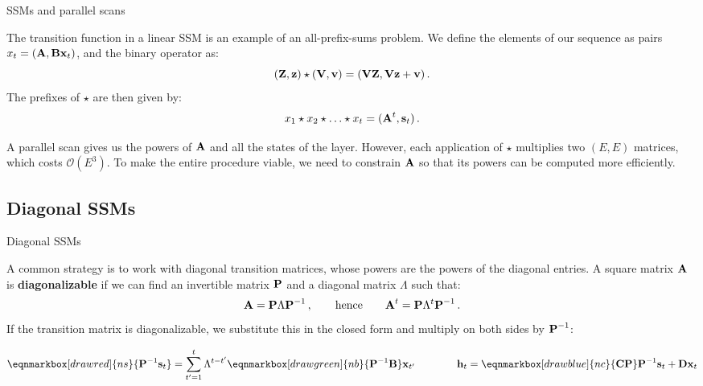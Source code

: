 \documentclass[11pt,aspectratio=169]{beamer}
\begin{document}
\begin{frame}{SSMs and parallel scans}
    \setlength{\parskip}{6pt}

    The transition function in a linear SSM is an example of an all-prefix-sums
    problem. We define the elements of our sequence as pairs
    $x_t=(\boldsymbol{\mathbf{A}},\boldsymbol{\mathbf{B}}\boldsymbol{\mathbf{x}}_t)$, and the binary operator as:
    \[
        (\boldsymbol{\mathbf{Z}},\boldsymbol{\mathbf{z}})\star(\boldsymbol{\mathbf{V}},\boldsymbol{\mathbf{v}})=(\boldsymbol{\mathbf{V}}\boldsymbol{\mathbf{Z}},\boldsymbol{\mathbf{V}}\boldsymbol{\mathbf{z}}+\boldsymbol{\mathbf{v}}) \,.
    \]
    The prefixes of $\star$ are then given by:
    \[
        x_1\star x_2\star\ldots\star x_t=(\boldsymbol{\mathbf{A}}^t,\boldsymbol{\mathbf{s}}_t) \,.
    \]

    A parallel scan gives us the powers of $\boldsymbol{\mathbf{A}}$ and all the states of the
    layer. However, each application of $\star$
    multiplies two $(E,E)$ matrices, which costs $\mathcal{O}(E^3)$. To make
    the entire procedure viable, we need to constrain $\boldsymbol{\mathbf{A}}$ so that its
    powers can be computed more efficiently.


\end{frame}

\subsection{Diagonal SSMs}

\begin{frame}{Diagonal SSMs}
    \setlength{\parskip}{5pt}

    A common strategy is to work with diagonal transition matrices, whose
    powers are the powers of the diagonal entries. A square matrix $\boldsymbol{\mathbf{A}}$ is
    \textbf{diagonalizable} if we can find an invertible matrix $\boldsymbol{\mathbf{P}}$ and
    a diagonal matrix $\Lambda$ such that:
    \[
        \boldsymbol{\mathbf{A}}=\boldsymbol{\mathbf{P}}\Lambda\boldsymbol{\mathbf{P}}^{-1} \,, \qquad \text{hence} \qquad
        \boldsymbol{\mathbf{A}}^t=\boldsymbol{\mathbf{P}}\Lambda^t\boldsymbol{\mathbf{P}}^{-1} \,.
    \]
    If the transition matrix is diagonalizable, we substitute this in the
    closed form and multiply on both sides by $\boldsymbol{\mathbf{P}}^{-1}$:

    \vspace{1.2em}
    \[
        \eqnmarkbox[drawred]{ns}{\vc{P}^{-1}\vc{s}_t}=\sum_{t'=1}^{t}\Lambda^{t-t'}\eqnmarkbox[drawgreen]{nb}{\vc{P}^{-1}\vc{B}}\vc{x}_{t'}
        \qquad\qquad
        \vc{h}_t=\eqnmarkbox[drawblue]{nc}{\vc{C}\vc{P}}\vc{P}^{-1}\vc{s}_t+\vc{D}\vc{x}_t
    \]

\end{frame}
\end{document}
